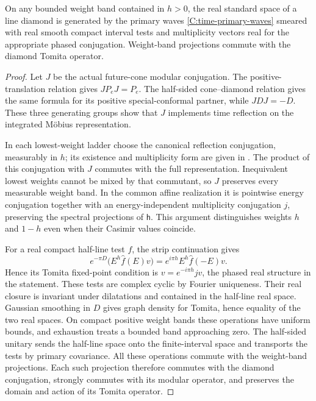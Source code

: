 \begin{lemma}\label{C:mobius-real-spaces}
On any bounded weight band contained in $h>0$, the
real standard space of a line diamond is generated
by the primary waves \eqref{C:time-primary-waves}
smeared with real smooth compact interval tests and
multiplicity vectors real for the appropriate phased
conjugation. Weight-band projections commute with
the diamond Tomita operator.
\end{lemma}

\begin{proof}
Let $J$ be the actual future-cone modular conjugation. The
positive-translation relation gives $JP_eJ=P_e$. The half-sided
cone--diamond relation gives the same formula for its positive
special-conformal partner, while $JDJ=-D$. These three generating
groups show that $J$ implements time reflection on the integrated
M\"obius representation.

In each lowest-weight ladder choose the canonical reflection
conjugation, measurably in $h$; its existence and multiplicity form
are given in \cite[Theorem~1.6.3 and its universal-cover extension]{LongoLectures2008}.
The product of this conjugation with $J$ commutes with the full
representation. Inequivalent lowest weights cannot be mixed by that
commutant, so $J$ preserves every measurable weight band. In the
common affine realization it is pointwise energy conjugation together
with an energy-independent multiplicity conjugation $j$, preserving
the spectral projections of $\mathsf h$. This argument distinguishes
weights $h$ and $1-h$ even when their Casimir values coincide.

For a real compact half-line test $f$, the strip continuation gives
\[
 e^{-\pi D}\bigl(E^h\widehat f(E)v\bigr)
 =e^{i\pi h}E^h\widehat f(-E)v.
\]
Hence its Tomita fixed-point condition is
$v=e^{-i\pi h}jv$, the phased real structure in the statement.
These tests are complex cyclic by
Fourier uniqueness. Their real closure is invariant
under dilatations and contained in the half-line
real space. Gaussian smoothing in $D$ gives graph
density for Tomita, hence equality of the two real
spaces. On compact positive weight bands these operations have uniform
bounds, and exhaustion treats a bounded band approaching zero.
The half-sided unitary sends the half-line
space onto the finite-interval space and transports
the tests by primary covariance. All these operations
commute with the weight-band projections. Each such projection
therefore commutes with the diamond conjugation, strongly commutes
with its modular operator, and preserves the domain and action of
its Tomita operator.
\end{proof}
